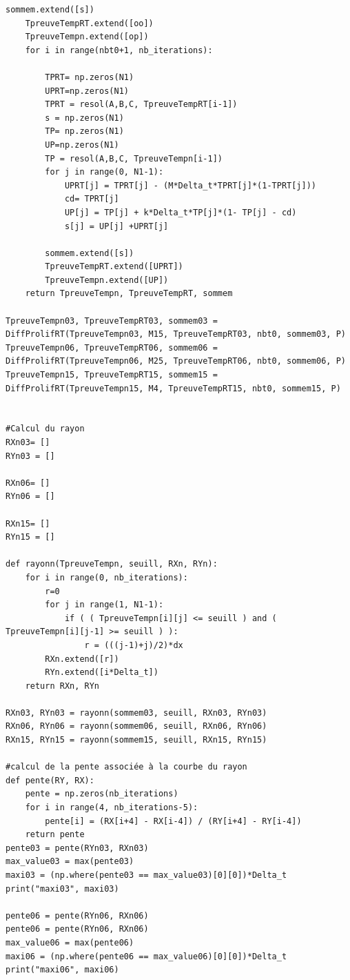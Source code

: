 \documentclass[12pt,a4paper]{article}
\begin{document}
\begin{lstlisting}[style=stylepython]
    sommem.extend([s])    
    TpreuveTempRT.extend([oo])
    TpreuveTempn.extend([op])
    for i in range(nbt0+1, nb_iterations):
        
        TPRT= np.zeros(N1)
        UPRT=np.zeros(N1)
        TPRT = resol(A,B,C, TpreuveTempRT[i-1])
        s = np.zeros(N1)
        TP= np.zeros(N1)
        UP=np.zeros(N1)
        TP = resol(A,B,C, TpreuveTempn[i-1])
        for j in range(0, N1-1):
            UPRT[j] = TPRT[j] - (M*Delta_t*TPRT[j]*(1-TPRT[j]))
            cd= TPRT[j]
            UP[j] = TP[j] + k*Delta_t*TP[j]*(1- TP[j] - cd)
            s[j] = UP[j] +UPRT[j]
            
        sommem.extend([s])
        TpreuveTempRT.extend([UPRT])
        TpreuveTempn.extend([UP])
    return TpreuveTempn, TpreuveTempRT, sommem

TpreuveTempn03, TpreuveTempRT03, sommem03 = DiffProlifRT(TpreuveTempn03, M15, TpreuveTempRT03, nbt0, sommem03, P) 
TpreuveTempn06, TpreuveTempRT06, sommem06 = DiffProlifRT(TpreuveTempn06, M25, TpreuveTempRT06, nbt0, sommem06, P) 
TpreuveTempn15, TpreuveTempRT15, sommem15 = DiffProlifRT(TpreuveTempn15, M4, TpreuveTempRT15, nbt0, sommem15, P) 


#Calcul du rayon 
RXn03= []
RYn03 = []

RXn06= []
RYn06 = []

RXn15= []
RYn15 = []

def rayonn(TpreuveTempn, seuill, RXn, RYn):
    for i in range(0, nb_iterations):
        r=0
        for j in range(1, N1-1):
            if ( ( TpreuveTempn[i][j] <= seuill ) and ( TpreuveTempn[i][j-1] >= seuill ) ):
                r = (((j-1)+j)/2)*dx
        RXn.extend([r])
        RYn.extend([i*Delta_t])
    return RXn, RYn
                
RXn03, RYn03 = rayonn(sommem03, seuill, RXn03, RYn03)  
RXn06, RYn06 = rayonn(sommem06, seuill, RXn06, RYn06)  
RXn15, RYn15 = rayonn(sommem15, seuill, RXn15, RYn15)

#calcul de la pente associée à la courbe du rayon
def pente(RY, RX):
    pente = np.zeros(nb_iterations)
    for i in range(4, nb_iterations-5):
        pente[i] = (RX[i+4] - RX[i-4]) / (RY[i+4] - RY[i-4])
    return pente 
pente03 = pente(RYn03, RXn03)
max_value03 = max(pente03)
maxi03 = (np.where(pente03 == max_value03)[0][0])*Delta_t
print("maxi03", maxi03)

pente06 = pente(RYn06, RXn06)
pente06 = pente(RYn06, RXn06)
max_value06 = max(pente06)
maxi06 = (np.where(pente06 == max_value06)[0][0])*Delta_t
print("maxi06", maxi06)


\end{lstlisting}
\end{document}
